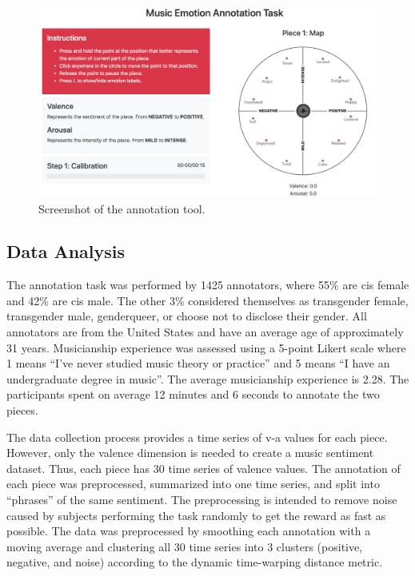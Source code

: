 \begin{figure}[!h]
 \centering
 \includegraphics[width=\columnwidth]{imgs/ismir19/annotation_tool.png}
 \caption{Screenshot of the annotation tool.}
 \label{fig:annotation_main}
\end{figure}

\subsection{Data Analysis}
\label{sec:data_analysys}

The annotation task was performed by 1425 annotators, where 55\% are cis female and 42\% are cis male. The other 3\% considered themselves as transgender female, transgender male, genderqueer, or choose not to disclose their gender. All annotators are from the United States and have an average age of approximately 31 years. Musicianship experience was assessed using a 5-point Likert scale where 1 means ``I've never studied music theory or practice'' and 5 means ``I have an undergraduate degree in music''. The average musicianship experience is 2.28. The participants spent on average 12 minutes and 6 seconds to annotate the two pieces.

The data collection process provides a time series of v-a values for each piece. However, only the valence dimension is needed to create a music sentiment dataset. Thus, each piece has 30 time series of valence values. The annotation of each piece was preprocessed, summarized into one time series, and split into ``phrases'' of the same sentiment. The preprocessing is intended to remove noise caused by subjects performing the task randomly to get the reward as fast as possible. The data was preprocessed by smoothing each annotation with a moving average and clustering all 30 time series into 3 clusters (positive, negative, and noise) according to the dynamic time-warping distance metric.


